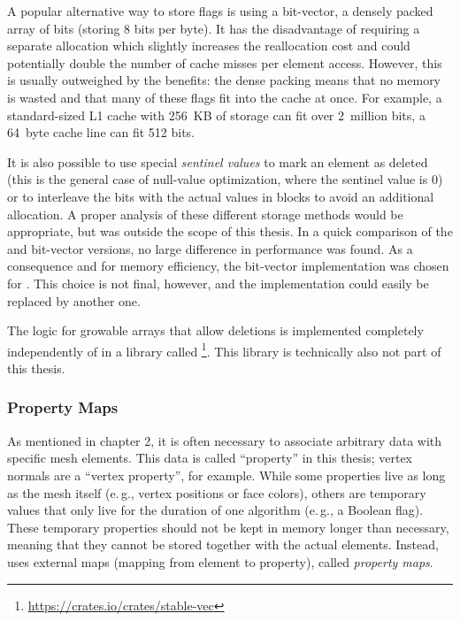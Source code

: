 A popular alternative way to store  flags is using a bit-vector, a densely packed array of bits (storing 8 bits per byte).
It has the disadvantage of requiring a separate allocation which slightly increases the reallocation cost and could potentially double the number of cache misses per element access.
However, this is usually outweighed by the benefits:
the dense packing means that no memory is wasted and that many of these flags fit into the cache at once.
For example, a standard-sized L1 cache with 256~KB of storage can fit over 2~million bits, a 64~byte cache line can fit 512 bits.

It is also possible to use special \emph{sentinel values} to mark an element as deleted (this is the general case of null-value optimization, where the sentinel value is 0) or to interleave the bits with the actual values in blocks to avoid an additional allocation.
A proper analysis of these different storage methods would be appropriate, but was outside the scope of this thesis.
In a quick comparison of the  and bit-vector versions, no large difference in performance was found.
As a consequence and for memory efficiency, the bit-vector implementation was chosen for .
This choice is not final, however, and the implementation could easily be replaced by another one.

The logic for growable arrays that allow deletions is implemented completely independently of  in a library called \footnote{\url{https://crates.io/crates/stable-vec}}.
This library is technically also not part of this thesis.





\newpage
\subsubsection*{Property Maps}

As mentioned in chapter 2, it is often necessary to associate arbitrary data with specific mesh elements.
This data is called \enquote{property} in this thesis; vertex normals are a \enquote{vertex property}, for example.
While some properties live as long as the mesh itself (e.\,g., vertex positions or face colors),  others are temporary values that only live for the duration of one algorithm (e.\,g., a Boolean  flag).
These temporary properties should not be kept in memory longer than necessary, meaning that they cannot be stored together with the actual elements.
Instead,  uses external maps (mapping from element to property), called \emph{property maps}.

